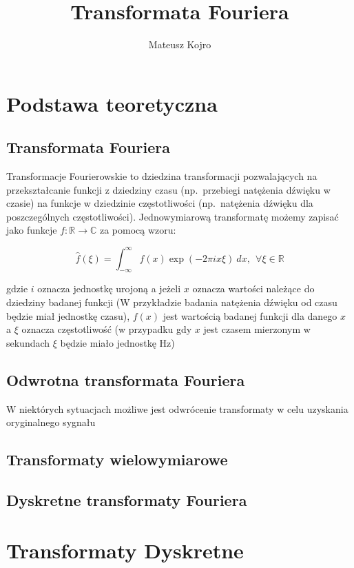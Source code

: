 \documentclass{artikel3}
\title{Transformata Fouriera}
\author{Mateusz Kojro}
\date{}
\begin{document}
\maketitle

\section{Podstawa teoretyczna}

\subsection{Transformata Fouriera}
Transformacje Fourierowskie to dziedzina transformacji pozwalających na przekształcanie
funkcji z dziedziny czasu (np.\ przebiegi natężenia dźwięku w czasie) na funkcje w dziedzinie częstotliwości (np.\ natężenia dźwięku dla poszczególnych częstotliwości). Jednowymiarową transformatę możemy zapisać jako funkcje $ f: \mathbb{R} \to \mathbb{C} $ za pomocą wzoru:

\begin{equation}
    \hat{f}(\xi) = \int_{-\infty}^{\infty} f(x) \exp{(-2 \pi i x \xi)} \ dx, \ \ \forall \xi \in \mathbb{R}
\end{equation}

gdzie $i$ oznacza jednostkę urojoną a jeżeli $x$ oznacza wartości należące do dziedziny badanej funkcji (W przykładzie badania natężenia dźwięku od czasu będzie miał jednostkę czasu), $f(x)$ jest wartością badanej funkcji dla danego $x$ a $\xi$ oznacza częstotliwość (w przypadku gdy $x$ jest czasem mierzonym w sekundach $\xi$ będzie miało jednostkę Hz)


\subsection{Odwrotna transformata Fouriera}

W niektórych sytuacjach możliwe jest odwrócenie transformaty w celu uzyskania oryginalnego sygnału


\subsection{Transformaty wielowymiarowe}

\subsection{Dyskretne transformaty Fouriera}







\section{Transformaty Dyskretne}
\end{document}
